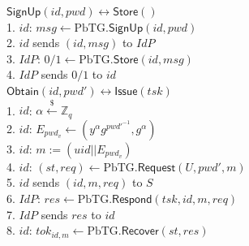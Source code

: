 \documentclass[conference]{IEEEtran}
\newcommand{\pwd}{pwd}
\newcommand{\uid}{id}
\newcommand{\tsk}{tsk}
\begin{document}
\begin{figure}
\begin{multicols}{2}
\noindent\underline{$\mathsf{SignUp}(\uid, \pwd) \longleftrightarrow \mathsf{Store}()$}\\
1. $\uid$: $msg \leftarrow \text{PbTG}.\mathsf{SignUp}(\uid,\pwd)$\\
2. $\uid$ sends $(\uid,msg)$ to $IdP$\\
3. $IdP$: $0/1 \leftarrow \text{PbTG}.\mathsf{Store}(\uid, msg)$\\
4. $IdP$ sends $0/1$ to $\uid$\\

\noindent\underline{$\mathsf{Obtain}(\uid, \pwd') \longleftrightarrow \mathsf{Issue}(\tsk)$}\\
1. $\uid$: $\alpha \xleftarrow{\$} \mathbb{Z}_q$\\
2. $\uid$: $E_{\pwd_{v}} \leftarrow (y^{\alpha} g^{{\pwd'}^{-1}}, g^{\alpha})$\\
3. $\uid$: $m := (uid||E_{\pwd_{v}})$\\
4. $\uid$: $(st,req) \leftarrow \text{PbTG}.\mathsf{Request}(U,\pwd', m)$   \\   
5. $\uid$ sends $(\uid,m,req)$ to $S$\\
6. $IdP$:  $res \leftarrow \text{PbTG}.\mathsf{Respond}(\tsk,\uid,m,req)$\\
7. $IdP$ sends $res$ to $\uid$\\
8. $\uid$: $tok_{\uid,m} \leftarrow \text{PbTG}.\mathsf{Recover}(st,res)$\\


\end{multicols}
\end{figure}
\end{document}
